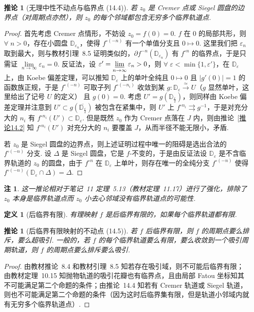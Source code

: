 \documentclass[11pt, a4paper, oneside]{ctexart}
\newtheorem{corollary}[theorem]{推论}
\newtheorem{definition}[theorem]{定义}
\newtheorem{remark}[theorem]{注}
\newcommand{\D}{\mathbb{D}}
\newcommand{\abs}[1]{\left|{#1}\right|}
\begin{document}
    \begin{corollary}[无理中性不动点与临界点 \uppercase\expandafter{} (14.4)]\label{推论14.4}
        若 $z_0$ 是 Cremer 点或 Siegel 圆盘的边界点（对周期点亦然），则 $z_0$ 的每个邻域都包含无穷多个临界轨道点.
    \end{corollary}
    \begin{proof}
        首先考虑 Cremer 点情形，不妨设 $z_0=f(0)=0$. $f$ 在 $0$ 的局部共形，则 $\forall\; n>0$，存在小圆盘 $\D_{\varepsilon_n}$，使得 $f^{\circ(-n)}$ 有一个单值分支且 $0\mapsto 0$. 这里我们把 $\varepsilon_n$ 取到最大，则与教材引理~8.5 证明类似的，$\partial f^{-n}(\D_{\varepsilon_n})$ 有 $f^{\circ n}$ 的临界点，于是只需证 $\lim\limits_{n\to\infty}\varepsilon_n=0$. 反证法，设 $\varepsilon'=\varliminf\limits_{n\to\infty}\varepsilon_n>0$，则 $\forall\; \varepsilon<\min\{1,\varepsilon'\}$，在 $\D_{\varepsilon}$ 上，由 Koebe 偏差定理，可以推知 $\D_{\varepsilon}$ 上的单叶全纯且 $0\mapsto 0$ 且 $\abs{g'(0)}=1$ 的函数族正规，于是 $f^{\circ(-n)}$ 可取子列 $f^{\circ(-n_i)}$ 收敛到某 $g:\D_{\varepsilon}\stackrel{\simeq}{\to}U$（$g$ 显然单叶，这里给出了记号 $U$ 的定义） 且 $g(0)=0$. 考虑 $U'=g(\D_{\frac{\varepsilon}{2}})$，则同样由 Koebe 偏差定理并注意到 $U'\subset g(\overline{\D_{\frac{\varepsilon}{2}}})$ 被包含在紧集中，则 $U'$ 上 $f^{\circ n_i}\rightrightarrows g^{-1}$，于是对充分大的 $n_i$ 有 $f^{\circ n_i}(U')\subset\D_{\varepsilon}$. 但是既然 $z_0$ 作为 Cremer 点落在 $J$ 内，则由推论~\ref{推论14.2} 知 $f^{\circ n_i}(U')$ 对充分大的 $n_i$ 要覆盖 $J$，从而半径不能无限小，矛盾.

        若 $z_0$ 是 Siegel 圆盘的边界点，则上述证明过程中唯一的阻碍是选出合法的 $f^{\circ (-n)}$ 分支. 设 $\Delta$ 是 Siegel 圆盘，它是 $f$-不变的，于是由反证法设 $\D_{\varepsilon}$ 是不含临界轨道的 $z_0$ 的圆盘，由于 $f^{\circ n}$ 在 $\D_{\varepsilon}$ 上单叶，则存在唯一的全纯分支 $f^{\circ (-n)}$ 使得 $f^{\circ(-n)}(\D_{\varepsilon}\cap \Delta)=\Delta$.
    \end{proof}
    \begin{remark}
        这一推论相对于笔记~11 定理~5.13（教材定理~11.17）进行了强化，排除了 $z_0$ 本身是临界轨道点而 $z_0$ 小去心邻域没有临界轨道点的可能性.
    \end{remark}

    \begin{definition}[后临界有限]
        有理映射 $f$ 是后临界有限的，如果每个临界轨道都有限.
    \end{definition}
    \begin{corollary}[后临界有限映射的不动点 (14.5)]
        若 $f$ 后临界有限，则 $f$ 的周期点要么排斥，要么超吸引. 一般的，若 $f$ 的每个临界轨道要么有限，要么收敛到一个吸引周期轨道，则 $f$ 的周期点要么排斥要么吸引.
    \end{corollary}
    \begin{proof}
        由教材推论~8.4 和教材引理~8.5 知若存在吸引域，则不可能后临界有限；由教材定理~10.15 知抛物轨道的吸引花瓣也有临界点，且由局部 Fatou 坐标知其不可能满足第二个命题的条件；由推论~14.4 知若有 Cremer 轨道或 Siegel 轨道，则也不可能满足第二个命题的条件（因为这时后临界集有限，但是轨道小邻域内就有无穷多个临界轨道点）.
    \end{proof}
\end{document}
